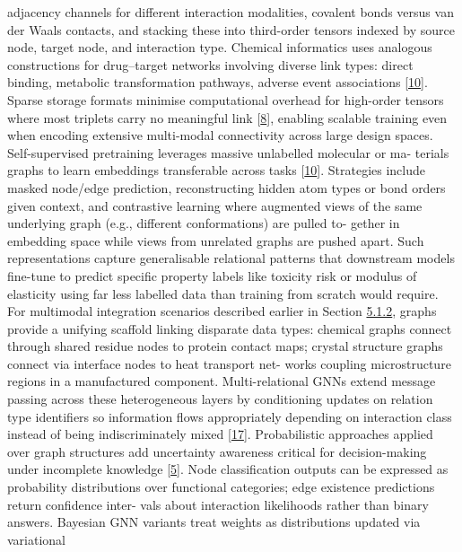 \documentclass[
]{article}
\begin{document}
adjacency channels for different interaction modalities, covalent bonds
versus van der Waals contacts, and stacking these into third-order
tensors indexed by source node, target node, and interaction type.
Chemical informatics uses analogous constructions for drug--target
networks involving diverse link types: direct binding, metabolic
transformation pathways, adverse event associations
{[}\protect\hyperlink{_bookmark50}{10}{]}. Sparse storage formats
minimise computational overhead for high-order tensors where most
triplets carry no meaningful link
{[}\protect\hyperlink{_bookmark48}{8}{]}, enabling scalable training
even when encoding extensive multi-modal connectivity across large
design spaces. Self-supervised pretraining leverages massive unlabelled
molecular or ma- terials graphs to learn embeddings transferable across
tasks {[}\protect\hyperlink{_bookmark50}{10}{]}. Strategies include
masked node/edge prediction, reconstructing hidden atom types or bond
orders given context, and contrastive learning where augmented views of
the same underlying graph (e.g., different conformations) are pulled to-
gether in embedding space while views from unrelated graphs are pushed
apart. Such representations capture generalisable relational patterns
that downstream models fine-tune to predict specific property labels
like toxicity risk or modulus of elasticity using far less labelled data
than training from scratch would require. For multimodal integration
scenarios described earlier in Section
\protect\hyperlink{spatial-complementarity-and-interaction-modelling}{5.1.2},
graphs provide a unifying scaffold linking disparate data types:
chemical graphs connect through shared residue nodes to protein contact
maps; crystal structure graphs connect via interface nodes to heat
transport net- works coupling microstructure regions in a manufactured
component. Multi-relational GNNs extend message passing across these
heterogeneous layers by conditioning updates on relation type
identifiers so information flows appropriately depending on interaction
class instead of being indiscriminately mixed
{[}\protect\hyperlink{_bookmark57}{17}{]}. Probabilistic approaches
applied over graph structures add uncertainty awareness critical for
decision-making under incomplete knowledge
{[}\protect\hyperlink{_bookmark45}{5}{]}. Node classification outputs
can be expressed as probability distributions over functional
categories; edge existence predictions return confidence inter- vals
about interaction likelihoods rather than binary answers. Bayesian GNN
variants treat weights as distributions updated via variational
\end{document}
